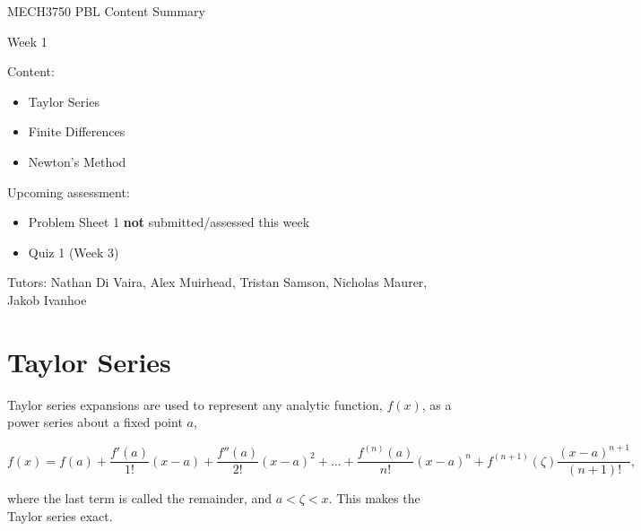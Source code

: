 \documentclass[12pt]{article}
\begin{document}
\begin{center}
{\Huge   MECH3750 PBL Content Summary}

\vspace{6mm}

{\Huge  Week 1}

\end{center}

\vspace{6mm}

{\Large Content:}
{\begin{itemize}
	\item Taylor Series
	\item Finite Differences
	\item Newton's Method
\end{itemize}}

\vspace{4mm}

{\Large Upcoming assessment:}
{\begin{itemize}
	\item Problem Sheet 1 \textbf{not} submitted/assessed this week
	\item Quiz 1 (Week 3)
\end{itemize}}

\vspace{4mm}

{Tutors: Nathan Di Vaira, Alex Muirhead, Tristan Samson, Nicholas Maurer, Jakob Ivanhoe}


\pagebreak

\section{Taylor Series}

Taylor series expansions are used to represent any analytic function, $f(x)$, as a power series about a fixed point $a$,

\vspace{2mm}

$$f(x) = f(a) + \frac{f'(a)}{1!}(x-a) + \frac{f''(a)}{2!}(x-a)^2 + ... + \frac{f^{(n)}(a)}{n!}(x-a)^n + f^{(n+1)}(\zeta)\frac{(x-a)^{n+1}}{(n+1)!},$$

\vspace{4mm}

where the last term is called the remainder, and $a<\zeta<x$. This makes the Taylor series exact.
\end{document}
